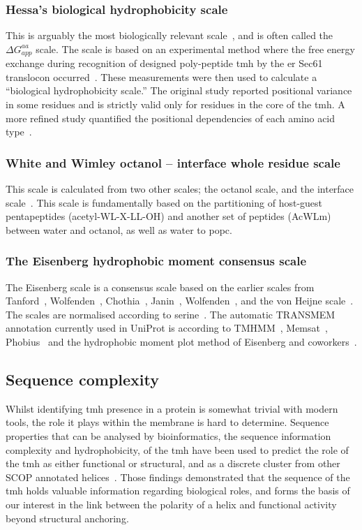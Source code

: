 \subsubsection{Hessa's biological hydrophobicity scale}
This is arguably the most biologically relevant scale~\cite{Peters2014}, and is often called the ${\Delta G}_{app}^{aa}$ scale.
The scale is based on an experimental method where the free energy exchange during recognition of designed poly-peptide \gls{tmh} by the \gls{er} Sec61 translocon occurred~\cite{Hessa2005}.
These measurements were then used to calculate a “biological hydrophobicity scale.” The original study reported positional variance in some residues and is strictly valid only for residues in the core of the \gls{tmh}.
A more refined study quantified the positional dependencies of each amino acid type~\cite{Hessa2007}.

\subsubsection{White and Wimley octanol \--- interface whole residue scale}
This scale is calculated from two other scales; the octanol scale, and the interface scale~\cite{White1999}.
This scale is fundamentally based on the partitioning of host-guest pentapeptides (acetyl-WL-X-LL-OH) and another set of peptides (AcWLm) between water and octanol, as well as water to \gls{popc}.

\subsubsection{The Eisenberg hydrophobic moment consensus scale}
The Eisenberg scale is a consensus scale based on the earlier scales from Tanford~\cite{Nozaki1971}, Wolfenden~\cite{Rose1993}, Chothia~\cite{Chothia1976}, Janin~\cite{Janin1979},  Wolfenden~\cite{Wolfenden1981}, and the von Heijne scale~\cite{VonHeijne1979}.
The scales are normalised according to serine~\cite{Eisenberg1984}.
The automatic TRANSMEM annotation currently used in UniProt is according to TMHMM~\cite{Krogh2001}, Memsat~\cite{Jones2007}, Phobius~\cite{Kall2004} and the hydrophobic moment plot method of Eisenberg and coworkers~\cite{Eisenberg1984}.

\subsection{Sequence complexity}
Whilst identifying \gls{tmh} presence in a protein is somewhat trivial with modern tools, the role it plays within the membrane is hard to determine. Sequence properties that can be analysed by bioinformatics, the sequence information complexity and hydrophobicity, of the \gls{tmh} have been used to predict the role of the \gls{tmh} as either functional or structural, and as a discrete cluster from other SCOP annotated helices~\cite{Wong2012}.
Those findings demonstrated that the sequence of the \gls{tmh} holds valuable information regarding biological roles, and forms the basis of our interest in the link between the polarity of a helix and functional activity beyond structural anchoring.

